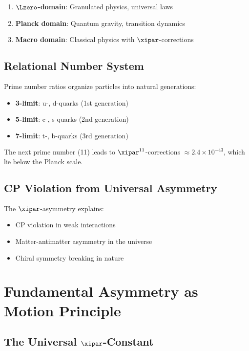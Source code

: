 	\begin{enumerate}
		\item \textbf{$\Lzero$-domain}: Granulated physics, universal laws
		\item \textbf{Planck domain}: Quantum gravity, transition dynamics
		\item \textbf{Macro domain}: Classical physics with $\xipar$-corrections
	\end{enumerate}
	
	\subsection{Relational Number System}
	
	Prime number ratios organize particles into natural generations:
	
	\begin{itemize}
		\item \textbf{3-limit}: u-, d-quarks (1st generation)
		\item \textbf{5-limit}: c-, s-quarks (2nd generation)
		\item \textbf{7-limit}: t-, b-quarks (3rd generation)
	\end{itemize}
	
	The next prime number (11) leads to $\xipar^{11}$-corrections $\approx 2.4 \times 10^{-43}$, which lie below the Planck scale.
	
	\subsection{CP Violation from Universal Asymmetry}
	
	The $\xipar$-asymmetry explains:
	\begin{itemize}
		\item CP violation in weak interactions
		\item Matter-antimatter asymmetry in the universe
		\item Chiral symmetry breaking in nature
	\end{itemize}
	
	\section{Fundamental Asymmetry as Motion Principle}
	
	\subsection{The Universal $\xipar$-Constant}
	
